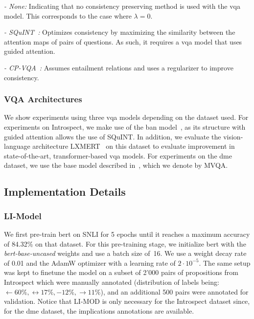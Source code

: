 {\setlength{\parindent}{0pt}\textit{- None:} Indicating that no consistency preserving method is used with the \gls{vqa} model. This corresponds to the case where $\lambda=0$.}

{\setlength{\parindent}{0pt}\textit{- SQuINT~\cite{selvaraju2020squinting}:} Optimizes consistency by maximizing the similarity between the attention maps of pairs of questions. As such, it requires a \gls{vqa} model that uses guided attention.}

{\setlength{\parindent}{0pt}\textit{- CP-VQA~\cite{tascon2022consistency}:} Assumes entailment relations and uses a regularizer to improve consistency.}



\subsubsection{VQA Architectures} We show experiments using three \gls{vqa} models depending on the dataset used. For experiments on Introspect, we make use of the \gls{ban} model~\cite{kim2018bilinear}, as its structure with guided attention allows the use of SQuINT. In addition, we evaluate the vision-language architecture LXMERT~\cite{tan2019lxmert} on this dataset to evaluate improvement in state-of-the-art, transformer-based \gls{vqa} models. For experiments on the \gls{dme} dataset, we use the base model described in~\cite{tascon2022consistency}, which we denote by MVQA. 


\subsection{Implementation Details}
\label{subsec:imp_details}
\subsubsection{LI-Model} We first pre-train \gls{bert} on SNLI for 5 epochs until it reaches a maximum accuracy of 84.32\% on that dataset. For this pre-training stage, we initialize \gls{bert} with the \textit{bert-base-uncased} weights and use a batch size of~16. We use a weight decay rate of 0.01 and the AdamW optimizer with a learning rate of $2\cdot10^{-5}$. The same setup was kept to finetune the model on a subset of 2'000 pairs of propositions from Introspect which were manually annotated (distribution of labels being: $\leftarrow 60\%, \leftrightarrow 17\%, - 12\%, \rightarrow  11\%$), and an additional 500 pairs were annotated for validation. Notice that LI-MOD is only necessary for the Introspect dataset since, for the \gls{dme} dataset, the implications annotations are available.


